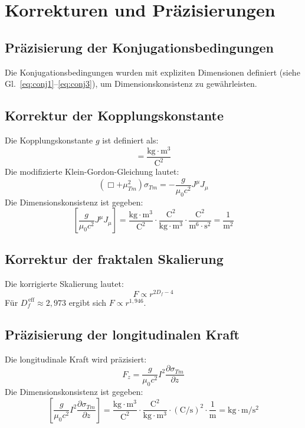	\section{Korrekturen und Präzisierungen}
	\subsection{Präzisierung der Konjugationsbedingungen}
	Die Konjugationsbedingungen wurden mit expliziten Dimensionen definiert (siehe Gl.~\ref{eq:conj1}–\ref{eq:conj3}), um Dimensionskonsistenz zu gewährleisten.
	
	\subsection{Korrektur der Kopplungskonstante}
	Die Kopplungskonstante $g$ ist definiert als:
	\begin{equation}
		[g] = \frac{\text{kg} \cdot \text{m}^3}{\text{C}^2}
	\end{equation}
	Die modifizierte Klein-Gordon-Gleichung lautet:
	\begin{equation}
		(\Box + \mu_{Tm}^2) \sigma_{Tm} = -\frac{g}{\mu_0 c^2} J^\mu J_\mu \label{eq:sigma_eq_final}
	\end{equation}
	Die Dimensionskonsistenz ist gegeben:
	\begin{equation}
		\left[\frac{g}{\mu_0 c^2} J^\mu J_\mu\right] = \frac{\text{kg} \cdot \text{m}^3}{\text{C}^2} \cdot \frac{\text{C}^2}{\text{kg} \cdot \text{m}^3} \cdot \frac{\text{C}^2}{\text{m}^6 \cdot \text{s}^2} = \frac{1}{\text{m}^2}
	\end{equation}
	
	\subsection{Korrektur der fraktalen Skalierung}
	Die korrigierte Skalierung lautet:
	\begin{equation}
		F \propto r^{2D_f - 4} \label{eq:fractal_scaling_final}
	\end{equation}
	Für $D_f^{\,\text{eff}} \approx 2{,}973$ ergibt sich $F \propto r^{1{,}946}$.
	
	\subsection{Präzisierung der longitudinalen Kraft}
	Die longitudinale Kraft wird präzisiert:
	\begin{equation}
		F_z = \frac{g}{\mu_0 c^2} I^2 \frac{\partial \sigma_{Tm}}{\partial z} \label{eq:long_force_final}
	\end{equation}
	Die Dimensionskonsistenz ist gegeben:
	\begin{equation}
		\left[\frac{g}{\mu_0 c^2} I^2 \frac{\partial \sigma_{Tm}}{\partial z}\right] = \frac{\text{kg} \cdot \text{m}^3}{\text{C}^2} \cdot \frac{\text{C}^2}{\text{kg} \cdot \text{m}^3} \cdot (\text{C}/\text{s})^2 \cdot \frac{1}{\text{m}} = \text{kg} \cdot \text{m}/\text{s}^2
	\end{equation}
	

